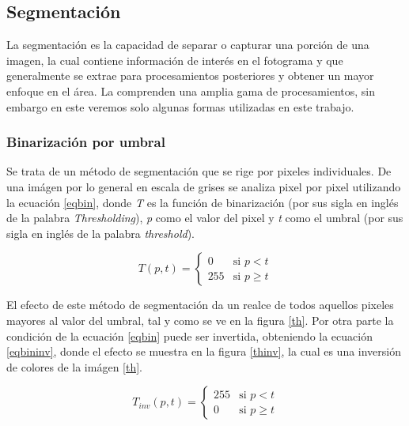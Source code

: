 \documentclass[twoside,spanish,ESP,MSc]{plantillaLabUPV}
\theoremstyle{definition}
\begin{document}
\subsection{Segmentación}
La segmentación es la capacidad de separar o capturar una porción de una imagen, la cual contiene información de interés en el fotograma y que generalmente se extrae para procesamientos posteriores y obtener un mayor enfoque en el área. La comprenden una amplia gama de procesamientos, sin embargo en este veremos solo algunas formas utilizadas en este trabajo.

\subsubsection{Binarización por umbral}
Se trata de un método de segmentación que se rige por pixeles individuales. De una imágen por lo general en escala de grises se analiza pixel por pixel utilizando la ecuación \ref{eqbin}, donde \textit{T} es la función de binarización (por sus sigla en inglés de la palabra \textit{Thresholding}), \textit{p} como el valor del pixel y \textit{t} como el umbral (por sus sigla en inglés de la palabra \textit{threshold}).

\begin{equation}\label{eqbin}
{ T(p,t) = \left \{ \begin{matrix} 0 & \mbox{si }p<t
\\ 255 & \mbox{si } p \geq t\end{matrix}\right. }
\end{equation}

El efecto de este método de segmentación da un realce de todos aquellos pixeles mayores al valor del umbral, tal y como se ve en la figura \ref{th}. Por otra parte la condición de la ecuación \ref{eqbin} puede ser invertida, obteniendo la ecuación \ref{eqbininv}, donde el efecto se muestra en la figura \ref{thinv}, la cual es una inversión de colores de la imágen \ref{th}. 

\begin{equation}\label{eqbininv}
{ T_{inv}(p,t) = \left \{ \begin{matrix} 255 & \mbox{si }p<t
\\ 0 & \mbox{si } p \geq t\end{matrix}\right. }
\end{equation}
\end{document}
